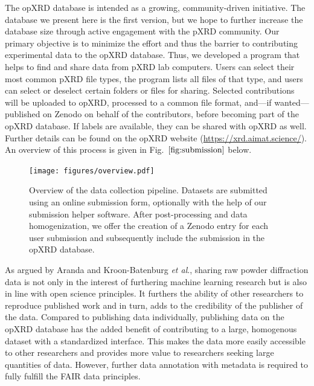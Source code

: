The opXRD database is intended as a growing, community-driven initiative. The database we present here is the first version, but we hope to further increase the database size through active engagement with the pXRD community. Our primary objective is to minimize the effort and thus the barrier to contributing experimental data to the opXRD database. Thus, we developed a program that helps to find and share data from pXRD lab computers. Users can select their most common pXRD file types, the program lists all files of that type, and users can select or deselect certain folders or files for sharing. Selected contributions will be uploaded to opXRD, processed to a common file format, and---if wanted---published on Zenodo on behalf of the contributors, before becoming part of the opXRD database. If labels are available, they can be shared with opXRD as well. Further details can be found on the opXRD website (\url{https://xrd.aimat.science/}). An overview of this process is given in Fig.~$\eqref{fig:submission}$ below.

\begin{figure}[!htb]
    \centering
    \texttt{[image: figures/overview.pdf]}
    \caption{Overview of the data collection pipeline. Datasets are submitted using an online submission form, optionally with the help of our submission helper software. After post-processing and data homogenization, we offer the creation of a Zenodo entry for each user submission and subsequently include the submission in the opXRD database.}
    \label{fig:submission}
\end{figure}

As argued by Aranda and Kroon-Batenburg \textit{et al}.\cite{Aranda2018, Kroon-Batenburg2024}, sharing raw powder diffraction data is not only in the interest of furthering machine learning research but is also in line with open science principles. It furthers the ability of other researchers to reproduce published work and in turn, adds to the credibility of the publisher of the data. Compared to publishing data individually, publishing data on the opXRD database has the added benefit of contributing to a large, homogenous dataset with a standardized interface. This makes the data more easily accessible to other researchers and provides more value to researchers seeking large quantities of data. However, further data annotation with metadata is required to fully fulfill the FAIR data principles.

